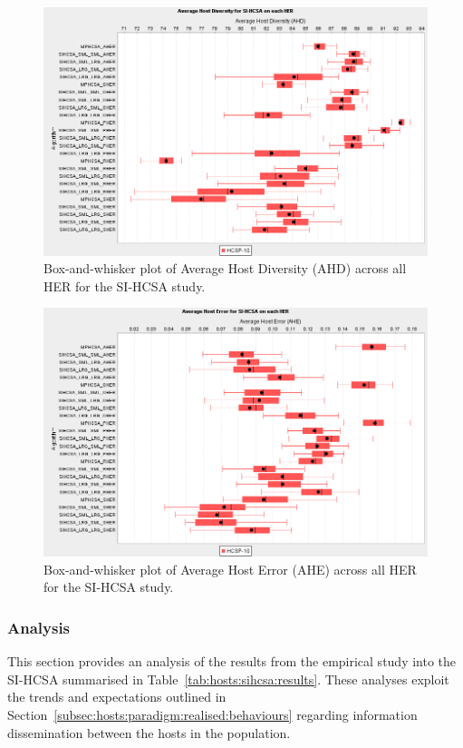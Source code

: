 \begin{figure}[htp]
	\centering
		\includegraphics[scale=0.70]{Hosts/SI-HCSA-AHD}
	\caption{Box-and-whisker plot of Average Host Diversity (AHD) across all HER for the SI-HCSA study.}
	\label{fig:hosts:sihcsa:ahd:boxplot}
\end{figure}

\begin{figure}[htp]
	\centering
		\includegraphics[scale=0.70]{Hosts/SI-HCSA-AHE}
	\caption{Box-and-whisker plot of Average Host Error (AHE) across all HER for the SI-HCSA study.}
	\label{fig:hosts:sihcsa:ahe:boxplot}
\end{figure}


%
%
\subsubsection{Analysis}
This section provides an analysis of the results from the empirical study into the SI-HCSA summarised in Table~\ref{tab:hosts:sihcsa:results}. These analyses exploit the trends and expectations outlined in Section~\ref{subsec:hosts:paradigm:realised:behaviours} regarding information dissemination between the hosts in the population.

